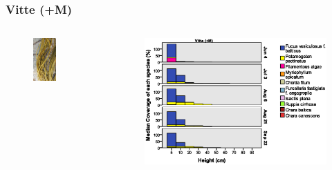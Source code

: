 \documentclass{beamer}
\begin{document}
\begin{frame}
\frametitle{Vitte (+M)}
\begin{columns}
\begin{column}{4.8cm}
\begin{figure}
\includegraphics[width=0.55\textwidth]{images/Fotos/chordafilum.jpg}
\end{figure}
\end{column}
\begin{column}{8.0cm}
\begin{figure}
\includegraphics[width=\textwidth]{images/Wuchshoehenkartierung/Vitte+Mb1.eps}
\end{figure}
\end{column}
\end{columns}
\end{frame}
\end{document}
